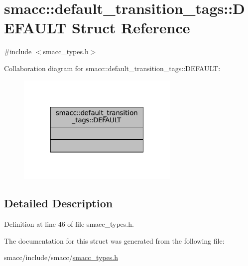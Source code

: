\hypertarget{structsmacc_1_1default__transition__tags_1_1DEFAULT}{}\section{smacc\+:\+:default\+\_\+transition\+\_\+tags\+:\+:D\+E\+F\+A\+U\+LT Struct Reference}
\label{structsmacc_1_1default__transition__tags_1_1DEFAULT}


{\ttfamily \#include $<$smacc\+\_\+types.\+h$>$}



Collaboration diagram for smacc\+:\+:default\+\_\+transition\+\_\+tags\+:\+:D\+E\+F\+A\+U\+LT\+:
\nopagebreak
\begin{figure}[H]
\begin{center}
\leavevmode
\includegraphics[width=220pt]{structsmacc_1_1default__transition__tags_1_1DEFAULT__coll__graph}
\end{center}
\end{figure}


\subsection{Detailed Description}


Definition at line 46 of file smacc\+\_\+types.\+h.



The documentation for this struct was generated from the following file\+:\begin{DoxyCompactItemize}
\item 
smacc/include/smacc/\hyperlink{smacc__types_8h}{smacc\+\_\+types.\+h}\end{DoxyCompactItemize}

